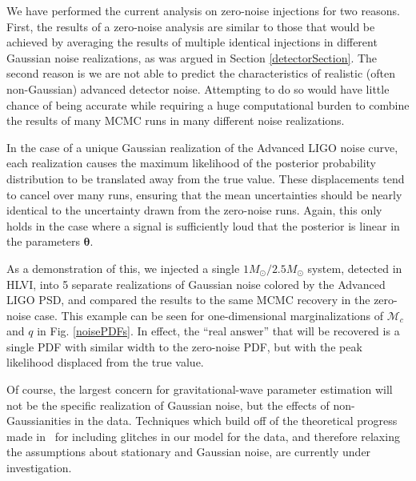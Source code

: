 \documentclass[11pt,a4paper]{emulateapj} 
\newcommand{\thpara}{\boldsymbol{\theta}}
\newcommand{\chmass}{\mathcal{M}_c}
\begin{document}
We have performed the current analysis on zero-noise injections for
two reasons.  First, the results of a zero-noise analysis are
similar to those that would be achieved by averaging the results of
multiple identical injections in different Gaussian noise
realizations, as was argued in Section \ref{detectorSection}.  The second reason 
is we are not able
to predict the characteristics of realistic (often non-Gaussian)
advanced detector noise.  Attempting to do so would have little chance
of being accurate while requiring a huge computational burden to
combine the results of many MCMC runs in many different noise realizations.

In the case of a unique Gaussian realization of the Advanced LIGO
noise curve, each realization causes the maximum likelihood of the
posterior probability distribution to be translated away from the true
value.  These displacements tend to cancel 
    over many runs, ensuring that the mean uncertainties should be nearly identical to 
   the uncertainty drawn from the zero-noise runs.  Again, this only holds in the case
  where a signal is sufficiently loud that the posterior is linear in the parameters 
  $\thpara$.

As a demonstration of this, we injected a single
$1M_{\odot}/2.5M_{\odot}$ system, detected in HLVI, into 5 separate
realizations of Gaussian noise colored by the Advanced LIGO PSD, and
compared the results to the same MCMC recovery in the zero-noise case.
This example can be seen for one-dimensional marginalizations of
$\chmass$ and $q$ in Fig. \ref{noisePDFs}.  In effect, the ``real
answer'' that will be recovered is a single PDF with similar width to
the zero-noise PDF, but with the peak likelihood displaced from the
true value.

Of course, the largest concern for gravitational-wave parameter
estimation will not be the specific realization of Gaussian noise, but
the effects of non-Gaussianities in the data.  Techniques which build
off of the theoretical progress made
in~\cite{Allen:2002jw,Rover:2011qd,Littenberg:2010gf} for including
glitches in our model for the data, and therefore relaxing the
assumptions about stationary and Gaussian noise, are currently under
investigation.
\end{document}
